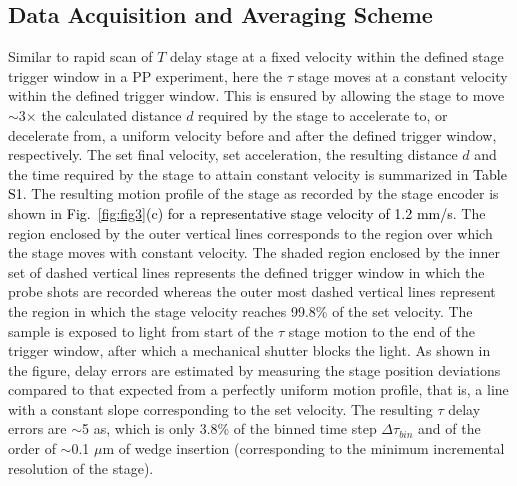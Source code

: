 \documentclass[%
aip,
amsmath,amssymb,
preprint,%
]{revtex4-2}
\newcommand*{\vt}[1]{\textcolor{black}{ #1}}
\newcommand*{\si}[1]{\textcolor{black}{ #1}}
\begin{document}
\subsection{Data Acquisition and Averaging Scheme}\label{acq}

Similar to rapid scan of $T$ delay stage at a fixed velocity within the defined stage trigger window in a PP experiment\cite{Bhat2023}, here the $\tau$ stage moves at a constant velocity within the defined trigger window. This is ensured by allowing the stage to move $\sim$3$\times$ the calculated distance $d$ required by the stage to accelerate to, or decelerate from, a uniform velocity before and after the defined trigger window, respectively. The set final velocity, set acceleration, the resulting distance $d$ and the time required by the stage to attain constant velocity is summarized in \si{Table S1}. The resulting motion profile of the stage as recorded by the stage encoder is shown in \vt{Fig.~\ref{fig:fig3}(c) for a representative stage velocity of 1.2 mm/s}. The region enclosed by the outer vertical lines corresponds to the region over which the stage moves with constant velocity. The shaded region enclosed by the inner set of dashed vertical lines represents the defined trigger window in which the probe shots are recorded whereas the outer most dashed vertical lines represent the region in which the stage velocity reaches 99.8\% of the set velocity. The sample is exposed to light from start of the $\tau$ stage motion to the end of the trigger window, after which a mechanical shutter blocks the light. As shown in the figure, delay errors are estimated by measuring the stage position deviations compared to that expected from a perfectly uniform motion profile, that is, a line with a constant slope corresponding to the set velocity. The resulting $\tau$ delay errors are $\sim$5 as, which is only 3.8\% of the binned time step $\Delta\tau_{bin}$ and of the order of $\sim$0.1 $\mu$m of wedge insertion (corresponding to the minimum incremental resolution of the stage). 
\end{document}
